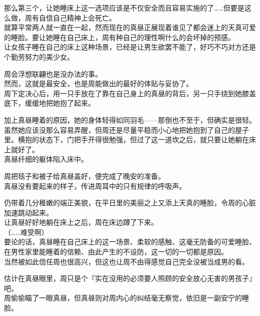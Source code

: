那么第三个，让她睡床上这一选项应该是不仅安全而且容易实施的了……但要是这么做，周有自信自己精神上会死亡。\\

就算平常两人就一直在一起，然而现在的真昼正展现着谁见了都会迷上的天真可爱的睡脸。要让她睡在自己床上，周有种自己的理性啊什么的会坏掉的预感。\\

让女孩子睡在自己的床上这种场景，已经是让男生欲罢不能了，好巧不巧对方还是个勤劳努力的美少女。

周会浮想联翩也是没办法的事。\\

然而，这就是最安全，也是周能做出的最好的体贴与妥协了。\\

周下定决心后，用一只手放在了靠在自己身上的真昼的背后，另一只手绕到她膝盖底下，缓缓地把她抱了起来。

加上真昼睡着的原因，她的身体轻得如同羽毛——那倒也不至于，但确实是很轻。\\

虽然她应该没那么容易弄醒，但周还是尽量平稳而小心地把她抱到了自己的屋子里。横抱的状态下，门把手开得很勉强，但过了这一道坎之后，就只要让她躺在床上就好了。\\

真昼纤细的躯体陷入床中。

周把毯子和被子给真昼盖好，便完成了晚安的准备。\\

真昼没有要起来的样子，传进周耳中的只有规律的呼吸声。

仍带着几分稚嫩的端正美貌，在平日里的美丽之上又添上天真的睡脸，令周的心脏加速跳动起来。\\

让真昼好好地躺在床上之后，周在床边蹲了下来。\\

（……难受啊）\\

要论的话，真昼睡在自己床上的这一场景、柔软的感触、这毫无防备的可爱睡脸、在男性家里能睡着的信赖、由此产生的不设防，这一切的一切都是原因。\\

当然被如此信任周也很高兴，但这也让周不由得感觉自己完全没被当成男的看。

估计在真昼眼里，周只是个『实在没用的必须要人照顾的安全放心无害的男孩子』吧。\\

周偷偷瞄了一眼真昼，但真昼则对周内心的纠结毫无察觉，依旧是一副安宁的睡脸。\\

